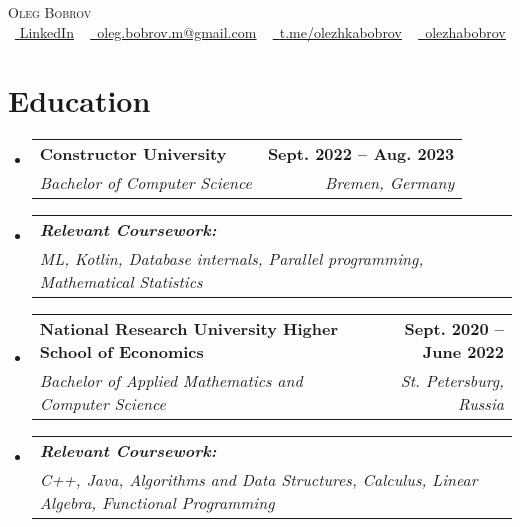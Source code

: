 \documentclass[letterpaper,11pt]{article}
\makeatletter
\newcommand{\resumeSubheading}[4]{
  \vspace{-2pt}\item
    \begin{tabular*}{1.0\textwidth}[t]{l@{\extracolsep{\fill}}r}
      #1 & \textbf{\large #2} \\
      \textit{\large#3} & \textit{\large #4} \\
    \end{tabular*}\vspace{-7pt}
}
\newcommand{\resumeSubHeadingListStart}{\begin{itemize}[leftmargin=0.0in, label={}]}
\newcommand{\resumeSubHeadingListEnd}{\end{itemize}}
\makeatother
\begin{document}

\begin{center}
    {\Huge \scshape Oleg Bobrov} \\ \vspace{1pt}
    \small \raisebox{-0.1\height}\faLinkedin\ \href{https://www.linkedin.com/in/oleg-bobrov-77a578210/}{  \underline{LinkedIn}} ~ \href{mailto:oleg.bobrov.m@gmail.com}{\raisebox{-0.2\height}\faEnvelope\  \underline{oleg.bobrov.m@gmail.com}} ~ 
    \href{https://t.me/olezhkabobrov//}{\raisebox{-0.2\height}\faTelegram\ \underline{t.me/olezhkabobrov}}  ~
    \href{https://github.com/olezhabobrov}{\raisebox{-0.2\height}\faGithub\ \underline{olezhabobrov}}
    \vspace{-8pt}
\end{center}


\section{Education}
  \resumeSubHeadingListStart
      \resumeSubheading
          {\textbf{\large{Constructor University}}}{Sept. 2022 -- Aug. 2023 }
          {\large{Bachelor of Computer Science}}{Bremen, Germany}
        \resumeSubheading
            {\quad \textbf{\textit{Relevant Coursework:}}}{}
            {\quad ML, Kotlin, Database internals, Parallel programming, Mathematical Statistics}{}
    \resumeSubheading
      {\textbf{\large{National Research University Higher School of Economics}}}{Sept. 2020 -- June 2022 }
      {\large{Bachelor of Applied Mathematics and Computer Science}}{St. Petersburg, Russia}
    \resumeSubheading
        {\quad \textbf{\textit{Relevant Coursework:}}}{}
        {\quad C++, Java, Algorithms and Data Structures,  Calculus, Linear Algebra, Functional Programming}{}
  \resumeSubHeadingListEnd

 
\end{document}
